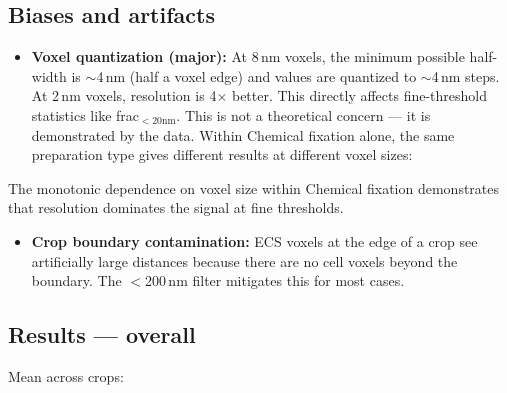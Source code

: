 \documentclass[times, twoside]{zHenriquesLab-StyleBioRxiv}
\begin{document}
\subsection*{Biases and artifacts}
\begin{itemize}[nosep]
\item \textbf{Voxel quantization (major):} At 8\,nm voxels, the minimum possible half-width is $\sim$4\,nm (half a voxel edge) and values are quantized to $\sim$4\,nm steps. At 2\,nm voxels, resolution is 4$\times$ better. This directly affects fine-threshold statistics like frac$_{<20\text{nm}}$. This is not a theoretical concern --- it is demonstrated by the data. Within Chemical fixation alone, the same preparation type gives different results at different voxel sizes:
\end{itemize}

\begin{table}[h]
\centering
{}
\end{table}

The monotonic dependence on voxel size within Chemical fixation demonstrates that resolution dominates the signal at fine thresholds.

\begin{itemize}[nosep]
\item \textbf{Crop boundary contamination:} ECS voxels at the edge of a crop see artificially large distances because there are no cell voxels beyond the boundary. The $<$200\,nm filter mitigates this for most cases.
\end{itemize}

\subsection*{Results --- overall}

Mean across crops:

\begin{table}[h]
\centering
{}
\end{table}
\end{document}
